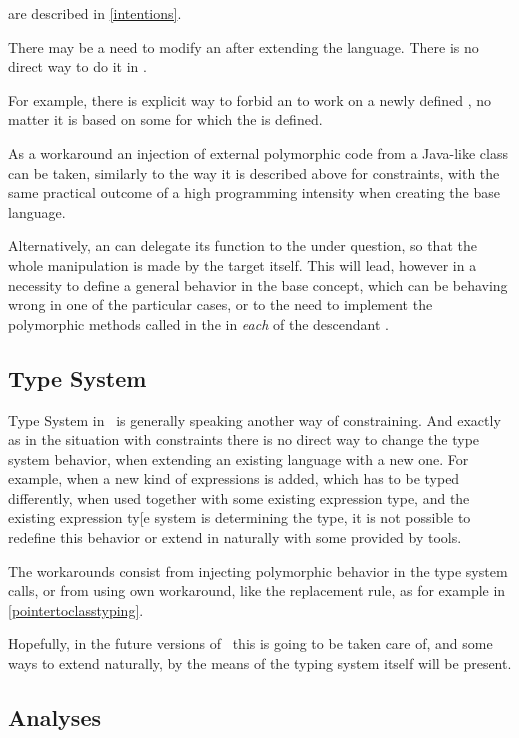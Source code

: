  are described in \ref{intentions}. 

There may be a need to modify an  after extending the language. There is no direct way to do it 
in \jbmps. 

For example, there is explicit way to forbid an  to work on a newly defined , no matter
it is based on some  for which the  is defined.

As a workaround an injection of external polymorphic code from a Java-like class can be taken, similarly to the way it is 
described above for constraints, with the same practical outcome of a high programming intensity when creating the base language.

Alternatively, an  can delegate its function to the  under question, so that the whole manipulation is 
made by the target  itself. This will lead, however in a necessity to define a general behavior in the base concept, which can
be behaving wrong in one of the particular cases, or to the need to implement the polymorphic methods called in the  in 
\emph{each} of the descendant .

\subsection{Type System}

Type System in \jbmps\ is generally speaking another way of constraining. And exactly as in the situation with constraints 
there is no direct way to change the type system behavior, when extending an existing language with a new one. For example, 
when a new kind of expressions is added, which has to be typed differently, when used together with some existing expression type,
and the existing expression ty[e system is determining the type, it is not possible to redefine this behavior or extend in
naturally with some provided by \jbmps tools.

The workarounds consist from injecting polymorphic behavior in the type system calls, or from using \jbmps own workaround, like 
the replacement rule, as for example in \ref{pointertoclasstyping}.

Hopefully, in the future versions of \jbmps\ this is going to be taken care of, and some ways to extend naturally, by the 
means of the typing system itself will be present.

\subsection{Analyses}

